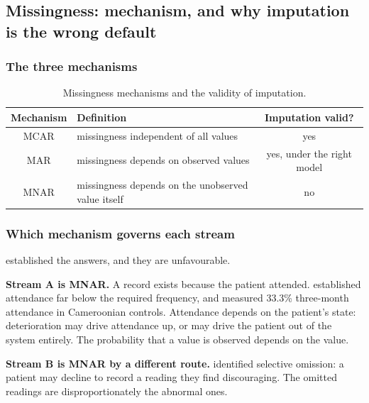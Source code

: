 \documentclass[12pt,a4paper,oneside]{report}
\begin{document}
\subsection{Missingness: mechanism, and why imputation is the wrong default}\label{sec:missingness}

\subsubsection{The three mechanisms}

\begin{table}[htbp]
\centering\small
\caption{Missingness mechanisms and the validity of imputation.}\label{tab:missing-mechanisms}
\begin{tabularx}{\textwidth}{@{}c X c@{}}
\toprule
\textbf{Mechanism} & \textbf{Definition} & \textbf{Imputation valid?} \\
\midrule
MCAR & missingness independent of all values & yes \\
MAR & missingness depends on observed values & yes, under the right model \\
MNAR & missingness depends on the unobserved value itself & no \\
\bottomrule
\end{tabularx}
\end{table}

\subsubsection{Which mechanism governs each stream}

 established the answers, and they are unfavourable.

\textbf{Stream A is MNAR.} A record exists because the patient attended.  established attendance far below the required frequency, and \textcite{bediang2021} measured 33.3\% three-month attendance in Cameroonian controls. Attendance depends on the patient's state: deterioration may drive attendance up, or may drive the patient out of the system entirely. The probability that a value is observed depends on the value.

\textbf{Stream B is MNAR by a different route.}  identified selective omission: a patient may decline to record a reading they find discouraging. The omitted readings are disproportionately the abnormal ones.
\end{document}
